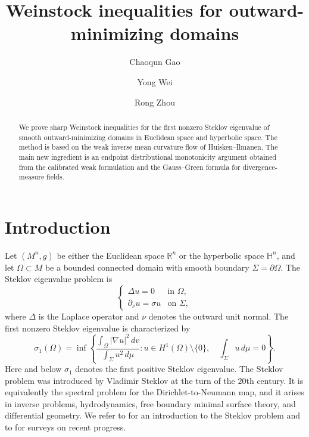 \documentclass[11pt,reqno]{amsart}
\title[Weinstock inequalities]{Weinstock inequalities for outward-minimizing domains}
\author[C. Gao]{Chaoqun Gao}
\author[Y. Wei]{Yong Wei}
\author[R. Zhou]{Rong Zhou}
\numberwithin{equation}{section}
\theoremstyle{definition}
\newcommand{\R}{\mathbb R}
\newcommand{\HH}{\mathbb H}
\begin{document}


\begin{abstract}
We prove sharp Weinstock inequalities for the first nonzero Steklov eigenvalue of smooth outward-minimizing domains in Euclidean space and hyperbolic space.  The method is based on the weak inverse mean curvature flow of Huisken--Ilmanen.  The main new ingredient is an endpoint distributional monotonicity argument obtained from the calibrated weak formulation and the Gauss--Green formula for divergence-measure fields.
\end{abstract}

\maketitle




\section{Introduction}

Let $(M^n,g)$ be either the Euclidean space $\R^n$ or the hyperbolic space $\HH^n$, and let $\Omega\subset M$ be a bounded connected domain with smooth boundary $\Sigma=\partial\Omega$.  The Steklov eigenvalue problem is
\begin{equation*}
\begin{cases}
    \Delta u=0 & \text{in }\Omega,\\
    \partial_\nu u=\sigma u & \text{on }\Sigma,
\end{cases}
\end{equation*}
where $\Delta$ is the Laplace operator and $\nu$ denotes the outward unit normal.  The first nonzero Steklov eigenvalue is characterized by
\begin{equation}\label{eq:steklov-variational}
    \sigma_1(\Omega)
    =\inf\left\{
        \frac{\int_\Omega |\nabla u|^2\,dv}{\int_{\Sigma} u^2\,d\mu}:
        u\in H^1(\Omega)\setminus\{0\},\quad
        \int_{\Sigma}u\,d\mu=0
      \right\}.
\end{equation}
Here and below $\sigma_1$ denotes the first positive Steklov eigenvalue.  The Steklov problem was introduced by Vladimir Steklov at the turn of the $20$th century.  It is equivalently the spectral problem for the Dirichlet-to-Neumann map, and it arises in inverse problems, hydrodynamics, free boundary minimal surface theory, and differential geometry.  We refer to \cite[Chapter~7]{LMP2023} for an introduction to the Steklov problem and to \cite{CGGS24,Fra20,GP2017} for surveys on recent progress.
\end{document}
